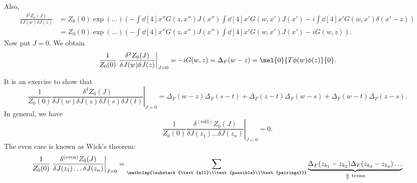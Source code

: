 \documentclass{jknotes} %
\begin{document}
Also,
{\hfuzz=34pt \begin{align}
    \frac{\delta^2Z_0(J)}{\delta J(w)\delta J(z)} &= Z_0(0)\exp(\dots)\left(-\int\dd[4]{x''}G(z,x'')J(x'')\int\dd[4]{x'}G(w,x')J(x') - i\int\dd[4]{x'} G(w,x')\delta(x'-z)\right) \\
                             &= Z_0(0)\exp(\dots)\left(-\int\dd[4]{x''}G(z,x'')J(x'')\int\dd[4]{x'}G(w,x')J(x') - iG(w,z)\right).
\end{align}}
Now put \(J=0\). We obtain
\begin{equation}
    \frac{1}{Z_0(0)}\left.\frac{\delta^2Z_0(J)}{\delta J(w)\delta J(z)}\right|_{J=0} 
    = -i G(w,z) = \Delta_F(w-z) = \mel{0}{T\phi(w)\phi(z)}{0}.
\end{equation}

It is an exercise to show that
\begin{equation}
    \frac{1}{Z_0(0)}\left.\frac{\delta^4Z_0(J)}{\delta J(w)\delta J(z)\delta J(s) \delta J(t)}\right|_{J=0} 
    = \Delta_F(w-z)\Delta_F(s-t) + \Delta_F(z-t)\Delta_F(w-s) + \Delta_F(w-t)\Delta_F(z-s).
\end{equation}
In general, we have
\begin{equation}
    \frac{1}{Z_0(0)}\left.\frac{\delta^{(\text{odd})}Z_0(J)}{\delta J(z_1)\dots\delta J(z_n)}\right|_{J=0} = 0.
\end{equation}
The even case is known as Wick's theorem:
\begin{equation}
    \frac{1}{Z_0(0)}\left.\frac{\delta^{(\text{even})}Z_0(J)}{\delta J(z_1)\dots\delta J(z_n)}\right|_{J=0} = \sum_{\mathclap{\substack{\text{all}\\\text{possible}\\\text{pairings}}}} \underbrace{\Delta_F(z_{k_1}-z_{k_2})\Delta_F(z_{k_3}-z_{k_4})\dots}_{\text{\(\frac{n}{2}\) terms}}
\end{equation}
\end{document}
